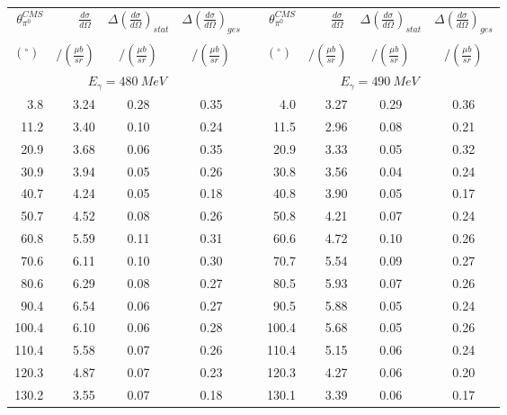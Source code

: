 \begin{table}[htbp] 
\begin{center} 
\begin{tabular}{|r|r|c|c|l|r|r|c|c|} 

\cline{1-4}
\cline{6-9} 
$\theta_{\pi^0}^{CMS}$ & 
$\displaystyle\frac{d\sigma}{d\Omega}\;$ & 
${\Delta}\left( \frac{d\sigma}{d\Omega}\right)_{stat}$ & 
${\Delta}\left( \frac{d\sigma}{d\Omega}\right)_{ges}$ & & 
$\theta_{\pi^0}^{CMS}$ & 
$\displaystyle\frac{d\sigma}{d\Omega}\;$ & 
${\Delta}\left( \frac{d\sigma}{d\Omega}\right)_{stat}$ & 
${\Delta}\left( \frac{d\sigma}{d\Omega}\right)_{ges}$ \\ 
& & & & & & & &\\ 
 $(^{\circ})\;$ & $/(\frac{{\mu}b}{sr})$ & $/(\frac{{\mu}b}{sr})$ & $/(\frac{{\mu}b}{sr})$ & & $(^{\circ})\;$ & $/(\frac{{\mu}b}{sr})$ & $/(\frac{{\mu}b}{sr})$ & $/(\frac{{\mu}b}{sr})$ \\ 
\cline{1-4} 
\cline{6-9} 
\multicolumn{4}{|c|}{ $E_{\gamma}=480~MeV$} & & 
\multicolumn{4}{c|}{ $E_{\gamma}=490~MeV$} \\ 
\cline{1-4} 
\cline{6-9} 
  3.8 &  3.24 &  0.28 &  0.35 & &   4.0 &  3.27 &  0.29 &  0.36 \\ 
 11.2 &  3.40 &  0.10 &  0.24 & &  11.5 &  2.96 &  0.08 &  0.21 \\ 
 20.9 &  3.68 &  0.06 &  0.35 & &  20.9 &  3.33 &  0.05 &  0.32 \\ 
 30.9 &  3.94 &  0.05 &  0.26 & &  30.8 &  3.56 &  0.04 &  0.24 \\ 
 40.7 &  4.24 &  0.05 &  0.18 & &  40.8 &  3.90 &  0.05 &  0.17 \\ 
 50.7 &  4.52 &  0.08 &  0.26 & &  50.8 &  4.21 &  0.07 &  0.24 \\ 
 60.8 &  5.59 &  0.11 &  0.31 & &  60.6 &  4.72 &  0.10 &  0.26 \\ 
 70.6 &  6.11 &  0.10 &  0.30 & &  70.7 &  5.54 &  0.09 &  0.27 \\ 
 80.6 &  6.29 &  0.08 &  0.27 & &  80.5 &  5.93 &  0.07 &  0.26 \\ 
 90.4 &  6.54 &  0.06 &  0.27 & &  90.5 &  5.88 &  0.05 &  0.24 \\ 
100.4 &  6.10 &  0.06 &  0.28 & & 100.4 &  5.68 &  0.05 &  0.26 \\ 
110.4 &  5.58 &  0.07 &  0.26 & & 110.4 &  5.15 &  0.06 &  0.24 \\ 
120.3 &  4.87 &  0.07 &  0.23 & & 120.3 &  4.27 &  0.06 &  0.20 \\ 
130.2 &  3.55 &  0.07 &  0.18 & & 130.1 &  3.39 &  0.06 &  0.17 \\ 

\end{tabular}
\end{center}
\end{table}
